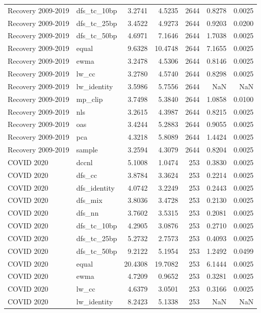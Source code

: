 \begin{tabular}{llrrrrr}
Recovery 2009-2019 & dfs_tc_10bp & 3.2741 & 4.5235 & 2644 & 0.8278 & 0.0025 \\
Recovery 2009-2019 & dfs_tc_25bp & 3.4522 & 4.9273 & 2644 & 0.9203 & 0.0200 \\
Recovery 2009-2019 & dfs_tc_50bp & 4.6971 & 7.1646 & 2644 & 1.7038 & 0.0025 \\
Recovery 2009-2019 & equal & 9.6328 & 10.4748 & 2644 & 7.1655 & 0.0025 \\
Recovery 2009-2019 & ewma & 3.2478 & 4.5306 & 2644 & 0.8146 & 0.0025 \\
Recovery 2009-2019 & lw_cc & 3.2780 & 4.5740 & 2644 & 0.8298 & 0.0025 \\
Recovery 2009-2019 & lw_identity & 3.5986 & 5.7556 & 2644 & NaN & NaN \\
Recovery 2009-2019 & mp_clip & 3.7498 & 5.3840 & 2644 & 1.0858 & 0.0100 \\
Recovery 2009-2019 & nls & 3.2615 & 4.3987 & 2644 & 0.8215 & 0.0025 \\
Recovery 2009-2019 & oas & 3.4244 & 5.2883 & 2644 & 0.9055 & 0.0025 \\
Recovery 2009-2019 & pca & 4.3218 & 5.8089 & 2644 & 1.4424 & 0.0025 \\
Recovery 2009-2019 & sample & 3.2594 & 4.3079 & 2644 & 0.8204 & 0.0025 \\
COVID 2020 & dccnl & 5.1008 & 1.0474 & 253 & 0.3830 & 0.0025 \\
COVID 2020 & dfs_cc & 3.8784 & 3.3624 & 253 & 0.2214 & 0.0025 \\
COVID 2020 & dfs_identity & 4.0742 & 3.2249 & 253 & 0.2443 & 0.0025 \\
COVID 2020 & dfs_mix & 3.8036 & 3.4728 & 253 & 0.2130 & 0.0025 \\
COVID 2020 & dfs_nn & 3.7602 & 3.5315 & 253 & 0.2081 & 0.0025 \\
COVID 2020 & dfs_tc_10bp & 4.2905 & 3.0876 & 253 & 0.2710 & 0.0025 \\
COVID 2020 & dfs_tc_25bp & 5.2732 & 2.7573 & 253 & 0.4093 & 0.0025 \\
COVID 2020 & dfs_tc_50bp & 9.2122 & 5.1954 & 253 & 1.2492 & 0.0499 \\
COVID 2020 & equal & 20.4308 & 19.7082 & 253 & 6.1444 & 0.0025 \\
COVID 2020 & ewma & 4.7209 & 0.9652 & 253 & 0.3281 & 0.0025 \\
COVID 2020 & lw_cc & 4.6379 & 3.0501 & 253 & 0.3166 & 0.0025 \\
COVID 2020 & lw_identity & 8.2423 & 5.1338 & 253 & NaN & NaN \\

\end{tabular}
